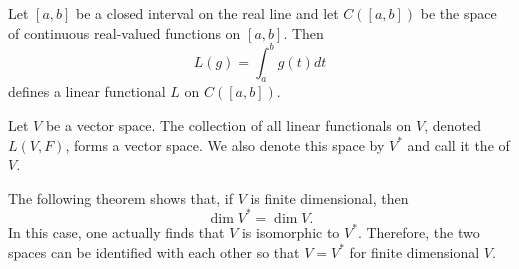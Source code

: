 \begin{example}
Let $[a, b]$ be a closed interval on the real line and let $C([a,b])$ be the space of continuous real-valued functions on $[a,b]$.
Then
\begin{equation*}
L(g) = \int_a^b g(t) dt
\end{equation*}
defines a linear functional $L$ on $C([a,b])$.
\end{example}

\begin{definition}
Let $V$ be a vector space.
The collection of all linear functionals on $V$, denoted $L(V,F)$, forms a vector space.
We also denote this space by $V^*$ and call it the  of $V$.
\end{definition}

The following theorem shows that, if $V$ is finite dimensional, then
\begin{equation*}
\dim V^* = \dim V.
\end{equation*}
In this case, one actually finds that $V$ is isomorphic to $V^*$.
Therefore, the two spaces can be identified with each other so that $V=V^*$ for finite dimensional $V$.


